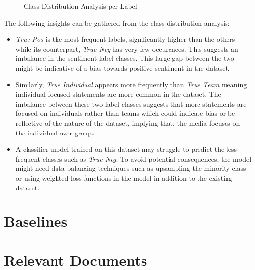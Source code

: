 \documentclass[titlepage]{article}
\begin{document}
\begin{figure}[H]
  \caption{Class Distribution Analysis per Label}
  \label{fig:class_distribution}
\end{figure}

The following insights can be gathered from the class distribution analysis:
\begin{itemize}
  \item \emph{True Pos} is the most frequent labels, significantly higher than the others while its counterpart, \emph{True Neg} has very few occurences. This
  suggests an imbalance in the sentiment label classes. This large gap between the two might be indicative of a bias towards positive sentiment in the dataset.
  \item Similarly, \emph{True Individual} appears more frequently than \emph{True Team} meaning individual-focused statements are more common in the dataset. The
  imbalance between these two label classes suggests that more statements are focused on individuals rather than teams which could indicate bias or be reflective 
  of the nature of the dataset, implying that, the media focuses on the individual over groups.
  \item A classifier model trained on this dataset may struggle to predict the less frequent classes such as \emph{True Neg}. To avoid potential consequences, the 
  model might need data balancing techniques such as upsampling the minority class or using weighted loss functions in the model in addition to the existing dataset. 
\end{itemize}

\section{Baselines}

\section{Relevant Documents}
\end{document}
